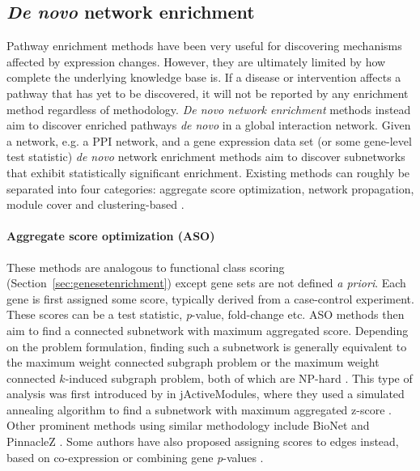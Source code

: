 \subsection{\emph{De novo} network enrichment}
\label{sec:diseasemodule}
Pathway enrichment methods have been very useful for discovering mechanisms affected by expression changes. However, they are ultimately limited by how complete the underlying knowledge base is. If a disease or intervention affects a pathway that has yet to be discovered, it will not be reported by any enrichment method regardless of methodology. \emph{De novo network enrichment} methods instead aim to discover enriched pathways \emph{de novo} in a global interaction network. Given a network, e.g. a PPI network, and a gene expression data set (or some gene-level test statistic) \emph{de novo} network enrichment methods aim to discover subnetworks that exhibit statistically significant enrichment.
Existing methods can roughly be separated into four categories: aggregate score optimization, network propagation, module cover and clustering-based \cite{Batra2017}.

\paragraph{Aggregate score optimization (ASO)} These methods are analogous to functional class scoring (Section~\ref{sec:genesetenrichment}) except gene sets are not defined \emph{a priori}. Each gene is first assigned some score, typically derived from a case-control experiment. These scores can be a test statistic, \textit{p}-value, fold-change etc. ASO methods then aim to find a connected subnetwork with maximum aggregated score. Depending on the problem formulation, finding such a subnetwork is generally equivalent to the maximum weight connected subgraph problem or the maximum weight connected $k$-induced subgraph problem, both of which are NP-hard \cite{Johnson1985,Ideker2002}. This type of analysis was first introduced by \citeauthor{Ideker2002} in jActiveModules, where they used a simulated annealing algorithm to find a subnetwork with maximum aggregated z-score \cite{Ideker2002}. Other prominent methods using similar methodology include BioNet \cite{Beisser2010} and PinnacleZ \cite{Chuang2007}. Some authors have also proposed assigning scores to edges instead, based on co-expression \cite{Guo2007} or combining gene \textit{p}-values \cite{Cabusora2005}.

